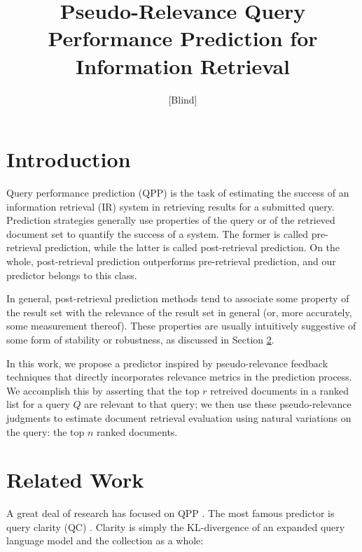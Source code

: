 \documentclass{sig-alternate}
\begin{document}
\author{[Blind]}

\title{Pseudo-Relevance Query Performance Prediction for Information Retrieval}

\maketitle
\begin{abstract}
\end{abstract}

\section{Introduction}\label{section.intro}

Query performance prediction (QPP) is the task of estimating the success of an information retrieval (IR) system in retrieving results for a submitted query. Prediction strategies generally use properties of the query or of the retrieved document set to quantify the success of a system. The former is called pre-retrieval prediction, while the latter is called post-retrieval prediction. On the whole, post-retrieval prediction outperforms pre-retrieval prediction, and our predictor belongs to this class.

In general, post-retrieval prediction methods tend to associate some property of the result set with the relevance of the result set in general (or, more accurately, some measurement thereof). These properties are usually intuitively suggestive of some form of stability or robustness, as discussed in Section \ref{section.related}. 

In this work, we propose a predictor inspired by pseudo-relevance feedback techniques that directly incorporates relevance metrics in the prediction process. We accomplish this by asserting that the top $r$ retreived documents in a ranked list for a query $Q$ are relevant to that query; we then use these pseudo-relevance judgments to estimate document retrieval evaluation using natural variations on the query: the top $n$ ranked documents. 

\section{Related Work}\label{section.related}

A great deal of research has focused on QPP \cite{Carmel2010}. The most famous predictor is query clarity (QC) \cite{Cronen-Townsend2002}. Clarity is simply the KL-divergence of an expanded query language model and the collection as a whole:
\end{document}
